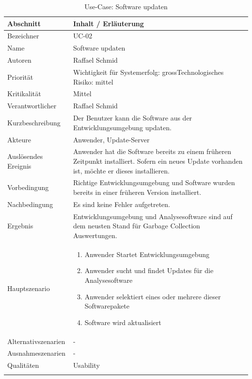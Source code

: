 \begin{longtable}{|p{4cm}|p{10.5cm}|}
\hline
   \textbf{Abschnitt} & \textbf{Inhalt / Erläuterung} \\\hline
   Bezeichner & UC-02\\\hline
   Name & Software updaten\\\hline
   Autoren & Raffael Schmid\\\hline
   Priorität & Wichtigkeit für Systemerfolg: gross\newline Technologisches Risiko: mittel\\\hline
   Kritikalität & Mittel\\\hline
   Verantwortlicher & Raffael Schmid\\\hline
   Kurzbeschreibung & Der Benutzer kann die Software aus der Entwicklungsumgebung updaten.\\\hline
   Akteure & Anwender, Update-Server\\\hline   
   Auslösendes Ereignis & Anwender hat die Software bereits zu einem früheren Zeitpunkt installiert. Sofern ein neues Update vorhanden ist, möchte er dieses installieren.\\\hline
   Vorbedingung & Richtige Entwicklungsumgebung und Software wurden bereits in einer früheren Version installiert.\\\hline
   Nachbedingung & Es sind keine Fehler aufgetreten.\\\hline
   Ergebnis & Entwicklungsumgebung und Analysesoftware sind auf dem neusten Stand für Garbage Collection Auswertungen.\\\hline
   Hauptszenario & 
	\begin{enumerate}
		\item Anwender Startet Entwicklungsumgebung
		\item Anwender sucht und findet Updates für die Analysesoftware
		\item Anwender selektiert eines oder mehrere dieser Softwarepakete
		\item Software wird aktualisiert
	\end{enumerate}
	\\\hline
   Alternativszenarien & -\\\hline
   Ausnahmeszenarien & -\\\hline
   Qualitäten & Usability\\\hline
\caption{Use-Case: Software updaten}
\end{longtable}

